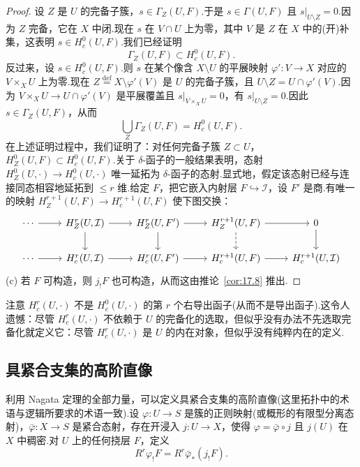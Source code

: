 \begin{proof}
设 $Z$ 是 $U$ 的完备子簇，$s \in \Gamma_Z(U, F)$.于是 $s \in \Gamma(U, F)$ 且 $s|_{U \setminus Z} = 0$.因为 $Z$ 完备，它在 $X$ 中闭.现在 $s$ 在 $V \cap U$ 上为零，其中 $V$ 是 $Z$ 在 $X$ 中的(开)补集，这表明 $s \in H^{0}_{c}(U, F)$.我们已经证明
\[
\Gamma_Z(U, F) \subset H^{0}_{c}(U, F).
\]
反过来，设 $s \in H^{0}_{c}(U, F)$.则 $s$ 在某个像含 $X \setminus U$ 的平展映射 $\varphi' \colon V \to X$ 对应的 $V \times_{X} U$ 上为零.现在 $Z \overset{\mathrm{def}}{=} X \setminus \varphi'(V)$ 是 $U$ 的完备子簇，且 $U \setminus Z = U \cap \varphi'(V)$.因为 $V \times_{X} U \to U \cap \varphi'(V)$ 是平展覆盖且 $s|_{V \times_{X} U} = 0$，有 $s|_{U \setminus Z} = 0$.因此 $s \in \Gamma_Z(U, F)$，从而
\[
\bigcup_{Z} \Gamma_Z(U, F) = H^{0}_{c}(U, F).
\]
在上述证明过程中，我们证明了：对任何完备子簇 $Z \subset U$，$H^{0}_{Z}(U, F) \subset H^{0}_{c}(U, F)$.关于 $\delta$-函子的一般结果表明，态射 $H^{0}_{Z}(U, \cdot) \to H^{0}_{c}(U, \cdot)$ 唯一延拓为 $\delta$-函子的态射.显式地，假定该态射已经与连接同态相容地延拓到 $\leq r$ 维.给定 $F$，把它嵌入内射层 $F \hookrightarrow \mathcal{I}$，设 $F'$ 是商.有唯一的映射 $H^{r+1}_{Z}(U, F) \to H^{r+1}_{c}(U, F)$ 使下图交换：
\[
\begin{tikzcd}
\cdots \arrow[r] & H^{r}_{Z}(U, \mathcal{I}) \arrow[r] \arrow[d] & H^{r}_{Z}(U, F') \arrow[r] \arrow[d] & H^{r+1}_{Z}(U, F) \arrow[r] \arrow[d, dashed] & 0 \arrow[d] \\
\cdots \arrow[r] & H^{r}_{c}(U, \mathcal{I}) \arrow[r] & H^{r}_{c}(U, F') \arrow[r] & H^{r+1}_{c}(U, F) \arrow[r] & H^{r+1}_{c}(U, \mathcal{I})
\end{tikzcd}
\]
(c) 若 $F$ 可构造，则 $j_{!}F$ 也可构造，从而这由推论~\ref{cor:17.8} 推出.
\end{proof}

注意 $H^{r}_{c}(U, \cdot)$ 不是 $H^{0}_{c}(U, \cdot)$ 的第 $r$ 个右导出函子(从而不是导出函子).这令人遗憾：尽管 $H^{r}_{c}(U, \cdot)$ 不依赖于 $U$ 的完备化的选取，但似乎没有办法不先选取完备化就定义它：尽管 $H^{r}_{c}(U, \cdot)$ 是 $U$ 的内在对象，但似乎没有纯粹内在的定义.

\subsection*{具紧合支集的高阶直像}

利用 Nagata 定理的全部力量，可以定义具紧合支集的高阶直像(这里拓扑中的术语与逻辑所要求的术语一致).设 $\varphi \colon U \to S$ 是簇的正则映射(或概形的有限型分离态射)，$\bar{\varphi} \colon X \to S$ 是紧合态射，存在开浸入 $j \colon U \to X$，使得 $\varphi = \bar{\varphi} \circ j$ 且 $j(U)$ 在 $X$ 中稠密.对 $U$ 上的任何挠层 $F$，定义
\[
R^{r}\varphi_{!}F = R^{r}\bar{\varphi}_*(j_{!}F).
\]


